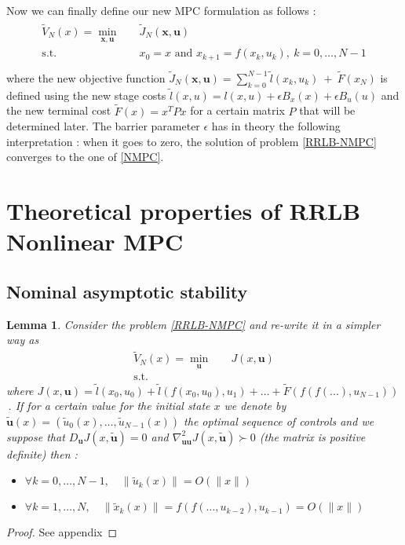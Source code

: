 \documentclass[12pt]{article}
\newtheorem{lemma}[theorem]{Lemma}
\theoremstyle{definition}
\theoremstyle{remark}
\begin{document}
\newpage
Now we can finally define our new MPC formulation as follows :
\begin{align}
	\begin{split}\label{RRLB-NMPC}
		\tilde{V}_N(x)=\underset{\mathbf{x},\mathbf{u}}{\min} &\quad \tilde{J}_N(\mathbf{x},\mathbf{u})\\
		\text{s.t.} &\quad x_0=x\text{ and }x_{k+1}=f(x_k,u_k),~k=0,\dots,N-1\\
	\end{split}
\end{align}
where the new objective function $\tilde{J}_N(\mathbf{x},\mathbf{u})=\sum_{k=0}^{N-1}\tilde{l}(x_k,u_k)~+~\tilde{F}(x_N)$ is defined using the new stage costs $\tilde{l}(x,u)=l(x,u)+\epsilon B_x(x)+\epsilon B_u(u)$ and the new terminal cost $\tilde{F}(x)=x^TPx$ for a certain matrix $P$ that will be determined later.
The barrier parameter $\epsilon$ has in theory the following interpretation : when it goes to zero, the solution of problem \ref{RRLB-NMPC} converges to the one of \ref{NMPC}.


\section{Theoretical properties of RRLB Nonlinear MPC}

\subsection{Nominal asymptotic stability}

\begin{lemma}
	\label{Lipchitzianity}
	Consider the problem \ref{RRLB-NMPC} and re-write it in a simpler way as 
	\begin{align*}
		\tilde{V}_N(x)=\underset{\mathbf{u}}{\min} &\quad J(x,\mathbf{u})\\
		\text{s.t.}&
	\end{align*}
	where $J(x,\mathbf{u})=\tilde{l}(x_0,u_0)+\tilde{l}(f(x_0,u_0),u_1)+\dots+\tilde{F}(f(f(...),u_{N-1}))$\,.
	If for a certain value for the initial state $x$ we denote by $\tilde{\mathbf{u}}(x)=(\tilde{u}_0(x),\dots,\tilde{u}_{N-1}(x))$ the optimal sequence of controls and we suppose that $D_\mathbf{u}J(x,\tilde{\mathbf{u}})=0$ and $\nabla_{\mathbf{u}\mathbf{u}}^2J(x, \tilde{\mathbf{u}})\succ 0$ (the matrix is positive definite) then :
	\begin{itemize}[label=\textbullet]
		\item $\forall k=0,\dots,N-1,\quad \|\tilde{u}_k(x)\|=O(\|x\|)$
		\item $\forall k=1,\dots,N,\quad \|\tilde{x}_k(x)\|=f(f(\dots,u_{k-2}),u_{k-1})=O(\|x\|)$
	\end{itemize}
\end{lemma}
\begin{proof}
	See appendix
\end{proof}
\end{document}
